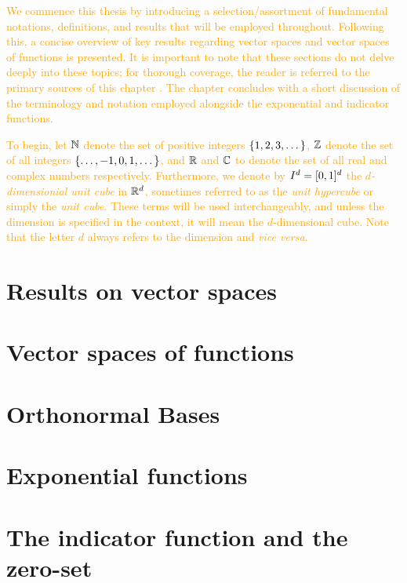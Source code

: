 \documentclass[../thesis.tex]{subfiles}
\begin{document}
\textcolor{orange}{  %
We commence this thesis by introducing a selection/assortment of fundamental notations, definitions, and results that will be employed throughout. Following this, a concise overview of key results regarding vector spaces and vector spaces of functions is presented. It is important to note that these sections do not delve deeply into these topics; for thorough coverage, the reader is referred to the primary sources of this chapter \cite{heilMetricsNormsInner2018,heilIntroductionRealAnalysis2019}. The chapter concludes with a short discussion of the terminology and notation employed alongside the exponential and indicator functions.
} %

\textcolor{orange}{  %
To begin, let $\mathbb{N}$ denote the set of positive integers $\{1,2,3, \dots\}$, $\mathbb{Z}$ denote the set of all integers $\{\dots, -1,0,1, \dots\}$, and $\mathbb{R}$ and $\mathbb{C}$ to denote the set of all real and complex numbers respectively. Furthermore, we denote by $I^d = [0,1]^d$ the \emph{$d$-dimensionial unit cube} in $\mathbb{R}^d$, sometimes referred to as the \emph{unit hypercube} or simply the \emph{unit cube}. These terms will be used interchangeably, and unless the dimension is specified in the context, it will mean the $d$-dimensional cube. Note that the letter $d$ always refers to the dimension and \emph{vice versa}.
} %

\section{Results on vector spaces}  %
    

\section{Vector spaces of functions}  %
    

\section{Orthonormal Bases}
    

\section{Exponential functions}
    

\section{The indicator function and the zero-set}
    
\end{document}
